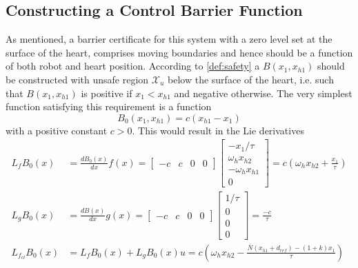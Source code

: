 \subsection{Constructing a Control Barrier Function}
As mentioned, a barrier certificate for this system with a zero level set at the surface of the heart, comprises moving boundaries and hence should be a function of both robot and heart position. According to \autoref{def:safety} a $B(x_1,x_{h1})$ should be constructed with unsafe region $\mathcal{X}_u$ below the surface of the heart, i.e. such that $B(x_1,x_{h1})$ is positive if $x_1<x_{h1}$ and negative otherwise. The very simplest function satisfying this requirement is a function
\begin{equation}
B_0(x_1,x_{h1})= c(x_{h1}-x_1)
\end{equation}
with a positive constant $c>0$. This would result in the Lie derivatives %
\begin{subequations}
\begin{align}
L_fB_0(x) &= \frac{dB_0(x)}{dx}f(x) =
\begin{bmatrix}
-c & c & 0 & 0
\end{bmatrix}
\begin{bmatrix}
-x_1/\tau\\
\omega_h x_{h2} \\
-\omega_h x_{h1} \\
0
\end{bmatrix}=
c\left(\omega_h x_{h2} + \frac{ x_1}{\tau}\right)\\
L_gB_0(x) &= \frac{dB(x)}{dx}g(x) =
\begin{bmatrix}
-c & c & 0 & 0
\end{bmatrix}
\begin{bmatrix}
1/\tau\\
0 \\ 0 \\ 0
\end{bmatrix}=
\frac{-c}{\tau}\\
L_{f_{cl}}B_0(x) & 
= L_fB_0(x)+L_gB_0(x)u = 
c\left(\omega_h x_{h2} - \frac{\bar{N}(x_{h1} + d_{ref})-(1+k) x_1}{\tau}\right)
\end{align}
\end{subequations}
